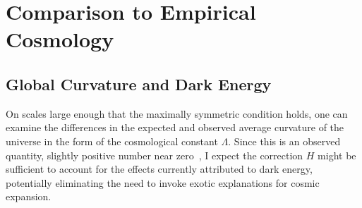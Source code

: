 \documentclass[aps,prd,preprint]{revtex4-1}
\begin{document}
\section{Comparison to Empirical Cosmology}
\subsection*{Global Curvature and Dark Energy}
On scales large enough that the maximally symmetric condition holds, one can examine the differences in the expected and observed average curvature of the universe in the form of the cosmological constant $\Lambda$. Since this is an observed quantity, slightly positive number near zero~\cite{bertone_2018}, I expect the correction $H$ might be sufficient to account for the effects currently attributed to dark energy, potentially eliminating the need to invoke exotic explanations for cosmic expansion.
\end{document}
